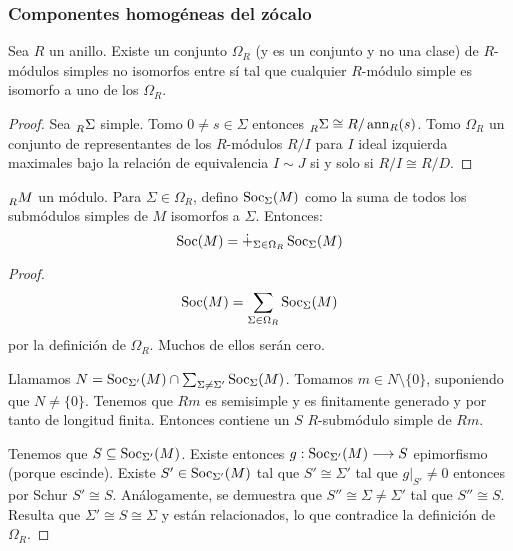 \subsubsection{Componentes homogéneas del zócalo}

\begin{lema}
  Sea \(R\) un anillo. Existe un conjunto \(\Omega_R\) (y es un conjunto
  y no una clase) de \(R\)-módulos simples no isomorfos entre sí tal que
  cualquier \(R\)-módulo simple es isomorfo a uno de los \(\Omega_R\).
\end{lema}
\begin{proof}
  Sea \(\prescript{}{R}{\Sigma}\) simple. Tomo
  \(0\neq s\in\Sigma\) entonces \(\prescript{}{R}{\Sigma}\cong
  R/\operatorname{ann}_R(s)\). Tomo \(\Omega_R\) un conjunto de representantes de los
  \(R\)-módulos \(R/I\) para \(I\) ideal izquierda maximales bajo
  la relación de equivalencia \(I\sim J\) si y solo si
  \(R/I\cong R/D\).

\end{proof}

\begin{prop}
  \(\prescript{}{R}{M}\) un módulo. Para \(\Sigma\in\Omega_R\), defino
  \(\operatorname{Soc}_\Sigma(M)\) como la suma de todos los submódulos simples de \(M\)
  isomorfos a \(\Sigma\). Entonces:
  \[
    \operatorname{Soc}(M)=\dot{+}_{\Sigma\in\Omega_R}\operatorname{Soc}_\Sigma(M)
  \]
\end{prop}
\begin{proof}
  \[
    \operatorname{Soc}(M)=\sum_{\Sigma\in\Omega_R}\operatorname{Soc}_\Sigma(M)
  \]
  por la definición de \(\Omega_R\). Muchos de ellos serán cero.

  Llamamos \(N=\operatorname{Soc}_{\Sigma'}(M)\cap\sum_{\Sigma\neq\Sigma'}\operatorname{Soc}_\Sigma(M)\).
  Tomamos \(m\in N\setminus\{0\}\), suponiendo que \(N\neq \{0\}\). Tenemos
  que \(Rm\) es semisimple y es finitamente generado y por tanto de longitud
  finita. Entonces contiene un \(S\) \(R\)-submódulo simple de \(Rm\).

  Tenemos que \(S\subseteq\operatorname{Soc}_{\Sigma'}(M)\). Existe entonces
  \(g:\operatorname{Soc}_{\Sigma'}(M)\longrightarrow S\) epimorfismo (porque escinde).
  Existe \(S'\in\operatorname{Soc}_{\Sigma'}(M)\) tal que \(S'\cong \Sigma'\) tal que
  \(g|_{S'}\neq0\) entonces por Schur \(S'\cong S\). Análogamente,
  se demuestra que \(S''\cong\Sigma\neq\Sigma'\) tal que \(S''\cong S\).
  Resulta que \(\Sigma'\cong S\cong\Sigma\) y están relacionados, lo que
  contradice la definición de \(\Omega_R\).

\end{proof}
